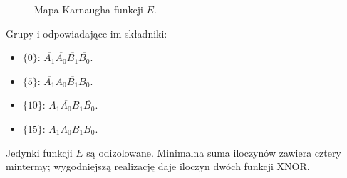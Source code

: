 \documentclass[12pt,a4paper]{article}
\begin{document}
\begin{minipage}{\textwidth}
\begin{figure}[H]
\caption{Mapa Karnaugha funkcji $E$.}
\end{figure}
\noindent Grupy i odpowiadające im składniki:
\begin{itemize}[nosep,leftmargin=1.6em]
\item \textcolor{blue!75!black}{$\{0\}$}: $\overline{A_1}\overline{A_0}\overline{B_1}\overline{B_0}$.
\item \textcolor{red!75!black}{$\{5\}$}: $\overline{A_1}A_0\overline{B_1}B_0$.
\item \textcolor{green!45!black}{$\{10\}$}: $A_1\overline{A_0}B_1\overline{B_0}$.
\item \textcolor{orange!85!black}{$\{15\}$}: $A_1A_0B_1B_0$.
\end{itemize}\end{minipage}\par\medskip
Jedynki funkcji $E$ są odizolowane. Minimalna suma iloczynów zawiera cztery mintermy; wygodniejszą realizację daje iloczyn dwóch funkcji XNOR.
\end{document}
